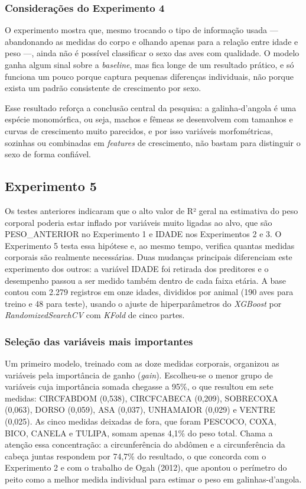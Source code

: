 \documentclass[12pt]{article}
\begin{document}
\subsubsection{Considerações do Experimento 4}

O experimento mostra que, mesmo trocando o tipo de informação usada ---
abandonando as medidas do corpo e olhando apenas para a relação entre idade e
peso ---, ainda não é possível classificar o sexo das aves com qualidade. O
modelo ganha algum sinal sobre a \textit{baseline}, mas fica longe de um
resultado prático, e só funciona um pouco porque captura pequenas diferenças
individuais, não porque exista um padrão consistente de crescimento por sexo.

Esse resultado reforça a conclusão central da pesquisa: a galinha-d'angola é uma
espécie monomórfica, ou seja, machos e fêmeas se desenvolvem com tamanhos e
curvas de crescimento muito parecidos, e por isso variáveis morfométricas,
sozinhas ou combinadas em \textit{features} de crescimento, não bastam para
distinguir o sexo de forma confiável.

\subsection{Experimento 5}

Os testes anteriores indicaram que o alto valor de R² geral na estimativa do peso corporal poderia estar inflado por variáveis muito ligadas ao alvo, que são PESO\_ANTERIOR no Experimento 1 e IDADE nos Experimentos 2 e 3. O Experimento 5 testa essa hipótese e, ao mesmo tempo, verifica quantas medidas corporais são realmente necessárias. Duas mudanças principais diferenciam este experimento dos outros: a variável IDADE foi retirada dos preditores e o desempenho passou a ser medido também dentro de cada faixa etária. A base contou com 2.279 registros em onze idades, divididos por animal (190 aves para treino e 48 para teste), usando o ajuste de hiperparâmetros do \textit{XGBoost} por \textit{RandomizedSearchCV} com \textit{KFold} de cinco partes.

\subsubsection{Seleção das variáveis mais importantes}

Um primeiro modelo, treinado com as doze medidas corporais, organizou as variáveis pela importância de ganho (\textit{gain}). Escolheu-se o menor grupo de variáveis cuja importância somada chegasse a 95\%, o que resultou em sete medidas: CIRCFABDOM (0,538), CIRCFCABECA (0,209), SOBRECOXA (0,063), DORSO (0,059), ASA (0,037), UNHAMAIOR (0,029) e VENTRE (0,025). As cinco medidas deixadas de fora, que foram PESCOCO, COXA, BICO, CANELA e TULIPA, somam apenas 4,1\% do peso total. Chama a atenção essa concentração: a circunferência do abdômen e a circunferência da cabeça juntas respondem por 74,7\% do resultado, o que concorda com o Experimento 2 e com o trabalho de Ogah (2012), que apontou o perímetro do peito como a melhor medida individual para estimar o peso em galinhas-d'angola.
\end{document}
